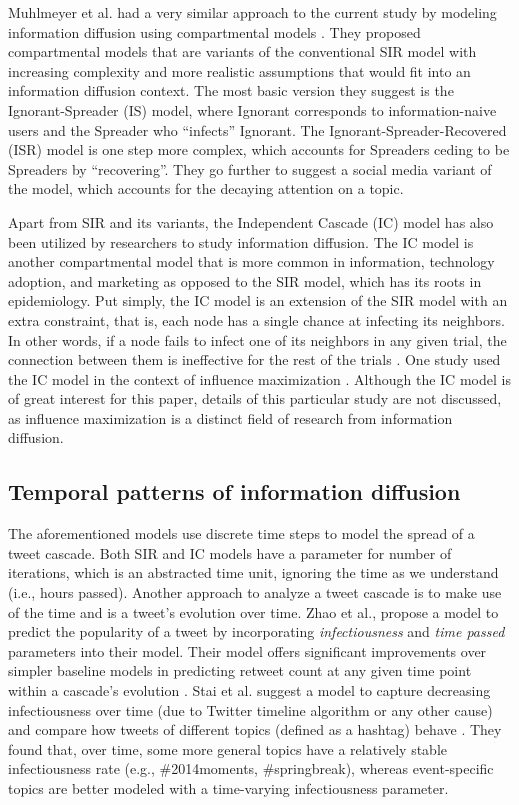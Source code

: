 \documentclass[11pt,a4paper]{article}
\begin{document}
    Muhlmeyer et al. had a very similar approach to the current study by modeling information diffusion using compartmental models \cite{muhlmeyer_modeling_2020}. They proposed compartmental models that are variants of the conventional SIR model with increasing complexity and more realistic assumptions that would fit into an information diffusion context. The most basic version they suggest is the Ignorant-Spreader (IS) model, where Ignorant corresponds to information-naive users and the Spreader who \enquote{infects} Ignorant. The Ignorant-Spreader-Recovered (ISR) model is one step more complex, which accounts for Spreaders ceding to be Spreaders by “recovering”. They go further to suggest a social media variant of the model, which accounts for the decaying attention on a topic.
    
    Apart from SIR and its variants, the Independent Cascade (IC) model has also been utilized by researchers to study information diffusion. The IC model is another compartmental model that is more common in information, technology adoption, and marketing as opposed to the SIR model, which has its roots in epidemiology. Put simply, the IC model is an extension of the SIR model with an extra constraint, that is, each node has a single chance at infecting its neighbors. In other words, if a node fails to infect one of its neighbors in any given trial, the connection between them is ineffective for the rest of the trials \cite{kempe_maximizing_2003}. One study used the IC model in the context of influence maximization \cite{kim_study_2015}. Although the IC model is of great interest for this paper, details of this particular study are not discussed, as influence maximization is a distinct field of research from information diffusion.
    
    \subsection{Temporal patterns of information diffusion}
    The aforementioned models use discrete time steps to model the spread of a tweet cascade. Both SIR and IC models have a parameter for number of iterations, which is an abstracted time unit, ignoring the time as we understand (i.e., hours passed). Another approach to analyze a tweet cascade is to make use of the time and is a tweet's evolution over time. Zhao et al., propose a model to predict the popularity of a tweet by incorporating \textit{infectiousness} and \textit{time passed} parameters into their model. Their model offers significant improvements over simpler baseline models in predicting retweet count at any given time point within a cascade's evolution \cite{zhao_seismic_2015}. Stai et al. suggest a model to capture decreasing infectiousness over time (due to Twitter timeline algorithm or any other cause) and compare how tweets of different topics (defined as a hashtag) behave \cite{stai_temporal_2018}. They found that, over time, some more general topics have a relatively stable infectiousness rate (e.g., \#2014moments, \#springbreak), whereas event-specific topics are better modeled with a time-varying infectiousness parameter.
\end{document}
